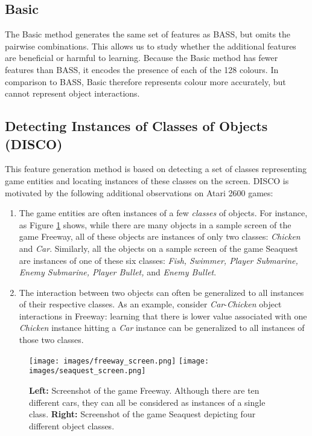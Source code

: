 \documentclass[twoside,11pt]{article}
\newcommand{\gamename}[1]{{\sc #1}}
\begin{document}
\subsection{Basic}
\label{sec:agents:rl:basic}

The Basic method generates the same set of features as BASS, but omits the pairwise combinations. This allows us to study whether the additional features are beneficial or harmful to learning. Because the Basic method has fewer features than BASS, it encodes the presence of each of the 128 colours. In comparison to BASS, Basic therefore represents colour more accurately, but cannot represent object interactions. 

\subsection{Detecting Instances of Classes of Objects (DISCO)}
\label{sec:agents:rl:disco}
This feature generation method is based on detecting a set of classes representing game entities and locating instances of these classes on the screen. DISCO is motivated by the following additional observations on Atari 2600 games:
\begin{enumerate}
	\item The game entities are often instances of a few \emph{classes} of objects. For instance, as Figure \ref{fig:agents:rl:disco:screenshot} shows, while there are many objects in a sample screen of the game \gamename{Freeway}, all of these objects are instances of only two classes: \emph{Chicken} and \emph{Car}. Similarly, all the objects on a sample screen of the game \gamename{Seaquest} are instances of one of these six classes: \emph{Fish, Swimmer, Player Submarine, Enemy Submarine, Player Bullet,} and \emph{Enemy Bullet}. 
	\item The interaction between two objects can often be generalized to all instances of their respective classes. As an example, consider \emph{Car}-\emph{Chicken} object interactions in \gamename{Freeway}: learning that there is lower value associated with one \emph{Chicken} instance hitting a \emph{Car} instance can be generalized to all instances of those two classes. 
\end{enumerate}

\begin{figure}[htb]
\begin{center}
\texttt{[image: images/freeway\_screen.png]}
\texttt{[image: images/seaquest\_screen.png]}
\caption{\textbf{Left:} Screenshot of the game \gamename{Freeway}. Although there are ten different cars, they can all be considered as instances of a single class. \textbf{Right:} Screenshot of the game \gamename{Seaquest} depicting four different object classes.\label{fig:agents:rl:disco:screenshot}}
\end{center}
\end{figure}
\end{document}
